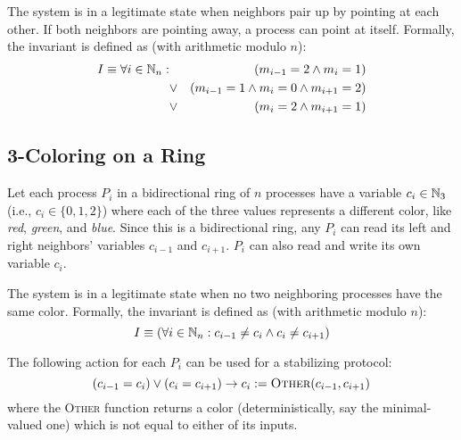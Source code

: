 The system is in a legitimate state when neighbors pair up by pointing at each other.
If both neighbors are pointing away, a process can point at itself.
Formally, the invariant is defined as (with arithmetic modulo $n$):
\begin{eqnarray*}
 I \equiv \forall i\in\mathbb{N}_n: & & (m_{i-1} = 2 \wedge m_i = 1)
                    \\ & \vee  & (m_{i-1} = 1 \wedge m_i = 0 \wedge m_{i+1} = 2)
                    \\ & \vee  & (m_i = 2 \wedge m_{i+1} = 1)
\end{eqnarray*}

\subsection{3-Coloring on a Ring}

Let each process $P_i$ in a bidirectional ring of $n$ processes have a variable $c_i\in \mathbb{N}_3$ (i.e., $c_i\in \{0,1,2\}$) where each of the three values represents a different color, like {\it red}, {\it green}, and {\it blue}.
Since this is a bidirectional ring, any $P_i$ can read its left and right neighbors' variables $c_{i-1}$ and $c_{i+1}$.
$P_i$ can also read and write its own variable $c_i$.

The system is in a legitimate state when no two neighboring processes have the same color.
Formally, the invariant is defined as (with arithmetic modulo $n$):
\[ I \equiv (\forall i\in\mathbb{N}_n: c_{i-1}\ne c_i \wedge c_i \ne c_{i+1}) \]

The following action for each $P_i$ can be used for a stabilizing protocol:
\[
 (c_{i-1} = c_i) \vee (c_i = c_{i+1}) \to c_i := \textsc{Other}(c_{i-1}, c_{i+1})
\]
where the \textsc{Other} function returns a color (deterministically, say the minimal-valued one) which is not equal to either of its inputs.

